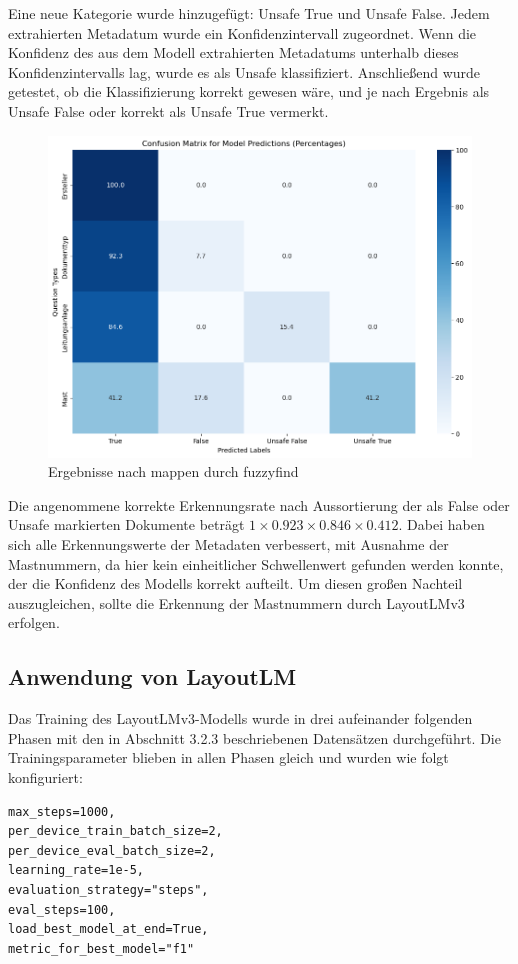 \documentclass[12pt,a4paper,twoside]{article}
\begin{document}
Eine neue Kategorie wurde hinzugefügt: Unsafe True und Unsafe False.  Jedem extrahierten Metadatum wurde ein Konfidenzintervall zugeordnet. Wenn die Konfidenz des aus dem Modell extrahierten Metadatums unterhalb dieses Konfidenzintervalls lag, wurde es als Unsafe klassifiziert. Anschließend wurde getestet, ob die Klassifizierung korrekt gewesen wäre, und je nach Ergebnis als Unsafe False oder korrekt als Unsafe True vermerkt.


\begin{figure}[H]
    \centering
    \includegraphics[width=0.7\linewidth]{DONUT-Transformer-results-unsafe.png}
    \caption{Ergebnisse nach mappen durch fuzzyfind}
    \label{fig:enter-label}
\end{figure}


Die angenommene korrekte Erkennungsrate nach Aussortierung der als False oder Unsafe markierten Dokumente beträgt \(1 \times 0.923 \times 0.846 \times 0.412\). Dabei haben sich alle Erkennungswerte der Metadaten verbessert, mit Ausnahme der Mastnummern, da hier kein einheitlicher Schwellenwert gefunden werden konnte, der die Konfidenz des Modells korrekt aufteilt. Um diesen großen Nachteil auszugleichen, sollte die Erkennung der Mastnummern durch LayoutLMv3 erfolgen.

\subsection{Anwendung von LayoutLM}
Das Training des LayoutLMv3-Modells wurde in drei aufeinander folgenden Phasen mit den in Abschnitt 3.2.3 beschriebenen Datensätzen durchgeführt. Die Trainingsparameter blieben in allen Phasen gleich und wurden wie folgt konfiguriert:

\begin{verbatim}
max_steps=1000,
per_device_train_batch_size=2,
per_device_eval_batch_size=2,
learning_rate=1e-5,
evaluation_strategy="steps",
eval_steps=100,
load_best_model_at_end=True,
metric_for_best_model="f1"
\end{verbatim}
\end{document}
